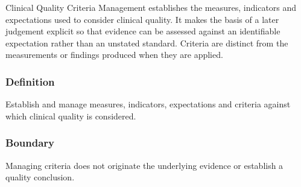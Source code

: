 Clinical Quality Criteria Management establishes the measures, indicators and expectations used to consider clinical quality. It makes the basis of a later judgement explicit so that evidence can be assessed against an identifiable expectation rather than an unstated standard. Criteria are distinct from the measurements or findings produced when they are applied.

\subsubsection*{Definition}

Establish and manage measures, indicators, expectations and criteria against which clinical quality is considered.

\subsubsection*{Boundary}

Managing criteria does not originate the underlying evidence or establish a quality conclusion.

